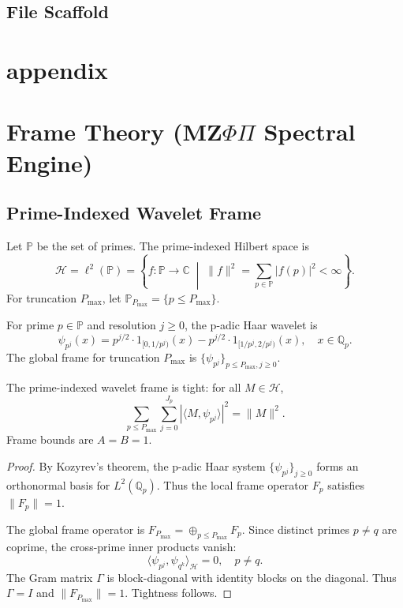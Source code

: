 \documentclass[11pt]{article}
\begin{document}
\subsection{File Scaffold}
\section{appendix}
\section{Frame Theory (MZ$\Phi\Pi$ Spectral Engine)}

\subsection{Prime-Indexed Wavelet Frame}

\begin{definition}
Let $\mathbb{P}$ be the set of primes. The prime-indexed Hilbert space is
\[
\mathcal{H} = \ell^2(\mathbb{P}) = \left\{ f: \mathbb{P} \to \mathbb{C} \;\middle|\; \|f\|^2 = \sum_{p \in \mathbb{P}} |f(p)|^2 < \infty \right\}.
\]
For truncation $P_{\max}$, let $\mathbb{P}_{P_{\max}} = \{p \le P_{\max}\}$.
\end{definition}

\begin{definition}
For prime $p \in \mathbb{P}$ and resolution $j \ge 0$, the p-adic Haar wavelet is
\[
\psi_{p^j}(x) = p^{j/2} \cdot 1_{[0,1/p^j)}(x) - p^{j/2} \cdot 1_{[1/p^j,2/p^j)}(x), \quad x \in \mathbb{Q}_p.
\]
The global frame for truncation $P_{\max}$ is $\{\psi_{p^j}\}_{p \le P_{\max}, j \ge 0}$.
\end{definition}

\begin{theorem}
\label{thm:frame_tightness}
The prime-indexed wavelet frame is tight: for all $M \in \mathcal{H}$,
\[
\sum_{p \le P_{\max}} \sum_{j=0}^{J_p} |\langle M, \psi_{p^j} \rangle|^2 = \|M\|^2.
\]
Frame bounds are $A = B = 1$.
\end{theorem}

\begin{proof}
By Kozyrev's theorem, the p-adic Haar system $\{\psi_{p^j}\}_{j \ge 0}$ forms an orthonormal basis for $L^2(\mathbb{Q}_p)$. Thus the local frame operator $F_p$ satisfies $\|F_p\| = 1$.

The global frame operator is $F_{P_{\max}} = \oplus_{p \le P_{\max}} F_p$. Since distinct primes $p \neq q$ are coprime, the cross-prime inner products vanish:
\[
\langle \psi_{p^j}, \psi_{q^k} \rangle_{\mathcal{H}} = 0, \quad p \neq q.
\]
The Gram matrix $\Gamma$ is block-diagonal with identity blocks on the diagonal. Thus $\Gamma = I$ and $\|F_{P_{\max}}\| = 1$. Tightness follows.
\end{proof}
\end{document}
